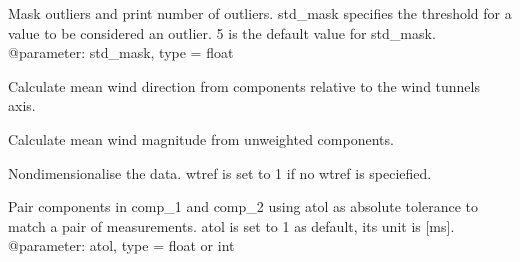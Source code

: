 \documentclass[letterpaper,10pt,english]{sphinxmanual}
\begin{document}
\begin{fulllineitems}
\begin{fulllineitems}
\label{\detokenize{index:windtunnel.Timeseries_nc.mask_outliers}}
Mask outliers and print number of outliers. std\_mask specifies the
threshold for a value to be considered an outlier. 5 is the default
value for std\_mask.
@parameter: std\_mask, type = float

\end{fulllineitems}


\begin{fulllineitems}
\label{\detokenize{index:windtunnel.Timeseries_nc.mean_direction}}
Calculate mean wind direction from components relative to the wind
tunnels axis.

\end{fulllineitems}


\begin{fulllineitems}
\label{\detokenize{index:windtunnel.Timeseries_nc.mean_magnitude}}
Calculate mean wind magnitude from unweighted components.

\end{fulllineitems}


\begin{fulllineitems}
\label{\detokenize{index:windtunnel.Timeseries_nc.nondimensionalise}}
Nondimensionalise the data. wtref is set to 1 if no wtref is
speciefied.

\end{fulllineitems}


\begin{fulllineitems}
\label{\detokenize{index:windtunnel.Timeseries_nc.pair_components}}
Pair components in comp\_1 and comp\_2 using atol as absolute
tolerance to match a pair of measurements. atol is set to 1 as default,
its unit is {[}ms{]}.
@parameter: atol, type = float or int


\end{fulllineitems}
\end{fulllineitems}
\end{document}
